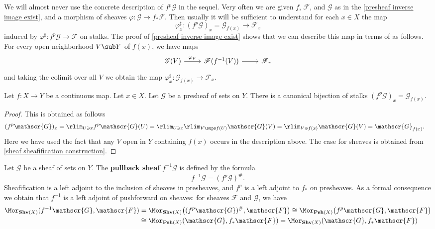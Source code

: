 \begin{remark}
We will almost never use the concrete description of $f^{p}\mathscr{G}$ in the sequel. Very often we are given $f$, $\mathscr{F}$, and $\mathscr{G}$ as in the \cref{presheaf inverse image exist}, and a morphism of sheaves $\varphi:\mathscr{G}\to f_*\mathscr{F}$. Then usually it will be sufficient to understand for each $x\in X$ the map
\[\varphi^{\sharp}_x:(f^{p}\mathscr{G})_x=\mathscr{G}_{f(x)}\to\mathscr{F}_x\]
induced by $\varphi^{\sharp}:f^{p}\mathscr{G}\to\mathscr{F}$ on stalks. The proof of \cref{presheaf inverse image exist} shows that we can describe this map in terms of as follows. For every open neighborhood $V\sub Y$ of $f(x)$, we have maps
\[\begin{tikzcd}
\mathscr{G}(V)\ar[r,"\varphi_V"]&\mathscr{F}(f^{-1}(V))\ar[r]&\mathscr{F}_x
\end{tikzcd}\]
and taking the colimit over all $V$ we obtain the map $\varphi^{\sharp}_x:\mathscr{G}_{f(x)}\to\mathscr{F}_x$.
\end{remark}
\begin{proposition}\label{pull back stalk}
Let $f:X\to Y$ be a continuous map. Let $x\in X$. Let $\mathscr{G}$ be a presheaf of sets on $Y$. There is a canonical bijection of stalks $(f^{p}\mathscr{G})_x=\mathscr{G}_{f(x)}$.
\end{proposition}
\begin{proof}
This is obtained as follows
\begin{align*}
(f^{p}\mathscr{G})_x&=\rlim_{U\ni x}f^{p}\mathscr{G}(U)=\rlim_{U\ni x}\rlim_{V\sups f(U)}\mathscr{G}(V)=\rlim_{V\ni f(x)}\mathscr{G}(V)=\mathscr{G}_{f(x)}.
\end{align*}
Here we have used the fact that any $V$ open in $Y$ containing $f(x)$ occurs in the description above. The case for sheaves is obtained from \cref{sheaf sheafification construction}.
\end{proof}
Let $\mathscr{G}$ be a sheaf of sets on $Y$. The \textbf{pullback sheaf} $f^{-1}\mathscr{G}$ is defined by the formula
\[f^{-1}\mathscr{G}=(f^{p}\mathscr{G})^{\#}.\]
Sheafification is a left adjoint to the inclusion of sheaves in presheaves, and $f^{p}$ is a left adjoint to $f_*$ on presheaves. As a formal consequence we obtain that $f^{-1}$ is a left adjoint of pushforward on sheaves: for sheaves $\mathscr{F}$ and $\mathscr{G}$, we have
\begin{align*}
\Mor_{\mathbf{Shv}(X)}(f^{-1}\mathscr{G},\mathscr{F})&=\Mor_{\mathbf{Shv}(X)}\big((f^{p}\mathscr{G})^{\#},\mathscr{F}\big)\cong\Mor_{\mathbf{Psh}(X)}\big(f^{p}\mathscr{G},\mathscr{F}\big)\\
&\cong\Mor_{\mathbf{Psh}(X)}(\mathscr{G},f_*\mathscr{F})=\Mor_{\mathbf{Shv}(X)}(\mathscr{G},f_*\mathscr{F})
\end{align*}

